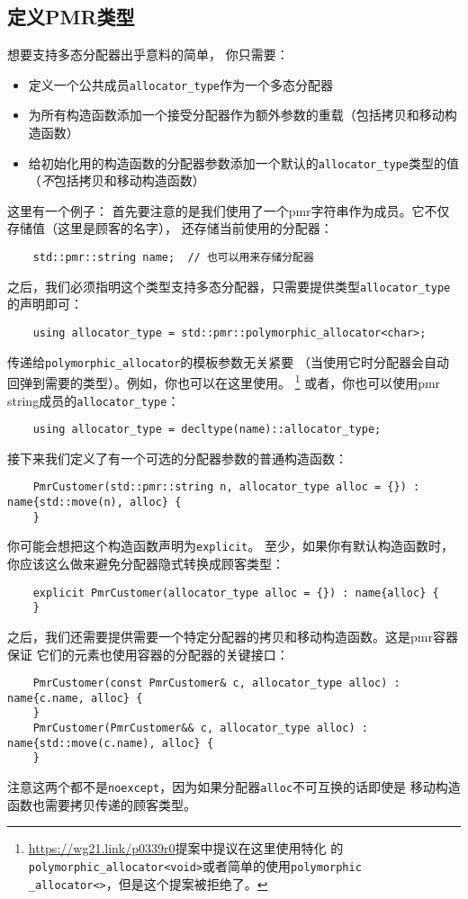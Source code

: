 \subsection{定义PMR类型}\label{ch29.3.1}
想要支持多态分配器出乎意料的简单，
你只需要：
\begin{itemize}
    \item 定义一个公共成员\texttt{allocator\_type}作为一个多态分配器
    \item 为所有构造函数添加一个接受分配器作为额外参数的重载（包括拷贝和移动构造函数）
    \item 给初始化用的构造函数的分配器参数添加一个默认的\texttt{allocator\_type}类型的值
    （\emph{不}包括拷贝和移动构造函数）
\end{itemize}
这里有一个例子：
首先要注意的是我们使用了一个pmr字符串作为成员。它不仅存储值（这里是顾客的名字），
还存储当前使用的分配器：
\begin{lstlisting}
    std::pmr::string name;  // 也可以用来存储分配器
\end{lstlisting}
之后，我们必须指明这个类型支持多态分配器，只需要提供类型\texttt{allocator\_type}的声明即可：
\begin{lstlisting}
    using allocator_type = std::pmr::polymorphic_allocator<char>;
\end{lstlisting}
传递给\texttt{polymorphic\_allocator}的模板参数无关紧要
（当使用它时分配器会自动回弹到需要的类型）。例如，你也可以在这里使用。
\footnote{\url{https://wg21.link/p0339r0}提案中提议在这里使用特化
的\texttt{polymorphic\_allocator<void>}或者简单的使用\texttt{polymorphic\\
\_allocator<>}，但是这个提案被拒绝了。}
或者，你也可以使用pmr string成员的\texttt{allocator\_type}：
\begin{lstlisting}
    using allocator_type = decltype(name)::allocator_type;
\end{lstlisting}
接下来我们定义了有一个可选的分配器参数的普通构造函数：
\begin{lstlisting}
    PmrCustomer(std::pmr::string n, allocator_type alloc = {}) : name{std::move(n), alloc} {
    }
\end{lstlisting}
你可能会想把这个构造函数声明为\texttt{explicit}。
至少，如果你有默认构造函数时，你应该这么做来避免分配器隐式转换成顾客类型：
\begin{lstlisting}
    explicit PmrCustomer(allocator_type alloc = {}) : name{alloc} {
    }
\end{lstlisting}
之后，我们还需要提供需要一个特定分配器的拷贝和移动构造函数。这是pmr容器保证
它们的元素也使用容器的分配器的关键接口：
\begin{lstlisting}
    PmrCustomer(const PmrCustomer& c, allocator_type alloc) : name{c.name, alloc} {
    }
    PmrCustomer(PmrCustomer&& c, allocator_type alloc) : name{std::move(c.name), alloc} {
    }
\end{lstlisting}
注意这两个都不是\texttt{noexcept}，因为如果分配器\texttt{alloc}不可互换的话即使是
移动构造函数也需要拷贝传递的顾客类型。

